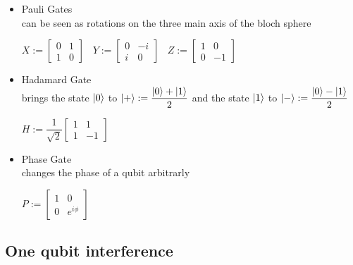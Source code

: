 \documentclass{article}
\begin{document}
\begin{itemize}

	\item Pauli Gates\\
	      can be seen as rotations on the three main axis of the bloch
	      sphere
	      \begin{center}
		      $	X:=\begin{bmatrix}
				      0 & 1 \\
				      1 & 0
			      \end{bmatrix}
			      \hspace{10pt}
			      Y:=\begin{bmatrix}
				      0 & -i \\
				      i & 0
			      \end{bmatrix}
			      \hspace{10pt}
			      Z:=\begin{bmatrix}
				      1 & 0  \\
				      0 & -1
			      \end{bmatrix}$
	      \end{center}


	\item Hadamard Gate\\
	      brings the state $\ket{0}$ to
	      $\ket{+} := \dfrac{\ket{0}+\ket{1}}{2}$
	      and the state $\ket{1}$ to $\ket{-} := \dfrac{\ket{0}-\ket{1}}{2}$
	      \begin{center}
		      $	H:=\dfrac{1}{\sqrt{2}}\begin{bmatrix}
				      1 & 1  \\
				      1 & -1
			      \end{bmatrix}$
	      \end{center}

	\item Phase Gate \\
	      changes the phase of a qubit arbitrarly
	      \begin{center}


		      $	P:=\begin{bmatrix}
				      1 & 0         \\
				      0 & e^{i\phi}
			      \end{bmatrix}$
	      \end{center}
\end{itemize}

\subsection{One qubit interference}
\end{document}
